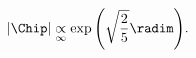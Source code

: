 \begin{equation}
|\Chip| \underset{\infty}{\propto} \exp{\left(\sqrt{\frac{2}{5}}
\radim \right)}.
\end{equation}

